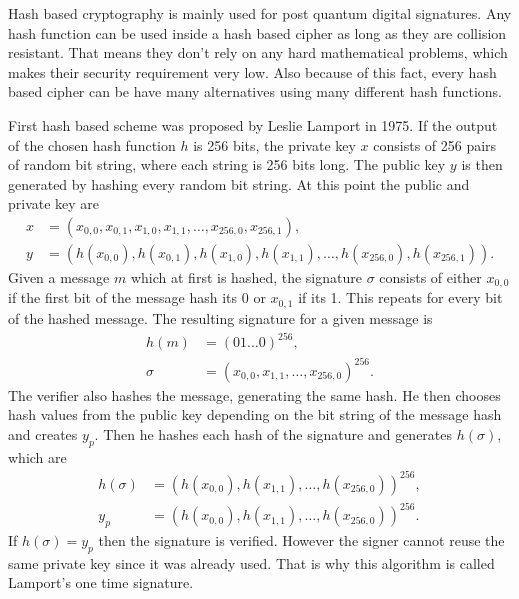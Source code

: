 Hash based cryptography is mainly used for post quantum digital signatures. Any hash function can be used inside a hash based cipher as long as they are collision resistant. That means they don't rely on any hard mathematical problems, which makes their security requirement very low. Also because of this fact, every hash based cipher can be have many alternatives using many different hash functions. \cite{Bernstein2009}

First hash based scheme was proposed by Leslie Lamport in 1975. If the output of the chosen hash function $h$ is 256 bits, the private key $x$ consists of 256 pairs of random bit string, where each string is 256 bits long. The public key $y$ is then generated by hashing every random bit string. At this point the public and private key are
\begin{align}
  x & =(x_{0,0}, x_{0,1}, x_{1,0}, x_{1,1},\dots,x_{256, 0},x_{256, 1}),                   \\
  y & =(h(x_{0,0}), h(x_{0,1}), h(x_{1,0}), h(x_{1,1}),\dots,h(x_{256, 0}),h(x_{256, 1})).
\end{align}
Given a message $m$ which at first is hashed, the signature $\sigma$ consists of either $x_{0,0}$ if the first bit of the message hash its 0 or $x_{0,1}$ if its 1. This repeats for every bit of the hashed message. The resulting signature for a given message is
\begin{align}
  h(m)   & =(01\dots0)^{256},                           \\
  \sigma & =(x_{0,0}, x_{1,1}, \dots, x_{256,0})^{256}.
\end{align}
The verifier also hashes the message, generating the same hash. He then chooses hash values from the public key depending on the bit string of the message hash and creates $y_p$. Then he hashes each hash of the signature and generates $h(\sigma)$, which are
\begin{align}
  h(\sigma) & =(h(x_{0,0}), h(x_{1,1}), \dots, h(x_{256,0}))^{256}, \\
  y_p       & =(h(x_{0,0}), h(x_{1,1}), \dots, h(x_{256,0}))^{256}.
\end{align}
If $h(\sigma)=y_p$ then the signature is verified. However the signer cannot reuse the same private key since it was already used. That is why this algorithm is called Lamport's one time signature. \cite{Bernstein149}

